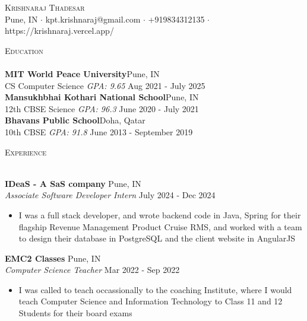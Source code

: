 \documentclass[a4paper]{article}
\newcommand{\lineunder} {
    \vspace*{-8pt} \\
    \hspace*{-18pt} \hrulefill \\
}
\newcommand{\header} [1] {
    {\hspace*{-18pt}\vspace*{6pt} \textsc{#1}}
    \vspace*{-6pt} \lineunder
}
\begin{document}
\vspace*{-40pt}

    

\vspace*{-10pt}
\begin{center}
	{\Huge \scshape {Krishnaraj Thadesar}}\\
	Pune, IN $\cdot$ kpt.krishnaraj@gmail.com $\cdot$ +919834312135 $\cdot$ https://krishnaraj.vercel.app/\\
\end{center}

\header{Education}
\textbf{MIT World Peace University}\hfill Pune, IN\\
CS Computer Science \textit{GPA: 9.65} \hfill Aug 2021 - July 2025\\
\vspace{2mm}
\textbf{Mansukhbhai Kothari National School}\hfill Pune, IN\\
12th CBSE Science \textit{GPA: 96.3} \hfill June 2020 - July 2021\\
\vspace{2mm}
\textbf{Bhavans Public School}\hfill Doha, Qatar\\
10th CBSE \textit{GPA: 91.8} \hfill June 2013 - September 2019\\
\vspace{2mm}

\header{Experience}
\vspace{1mm}

\textbf{IDeaS - A SaS company} \hfill Pune, IN\\
\textit{Associate Software Developer Intern} \hfill July 2024 - Dec 2024\\
\vspace{-1mm}
\begin{itemize} \itemsep 1pt
	\item I was a full stack developer, and wrote backend code in Java, Spring for their flagship Revenue Management Product Cruise RMS, and worked with a team to design their database in PostgreSQL and the client website in AngularJS
\end{itemize}
\textbf{EMC2 Classes} \hfill Pune, IN\\
\textit{Computer Science Teacher} \hfill Mar 2022 - Sep 2022\\
\vspace{-1mm}
\begin{itemize} \itemsep 1pt
	\item I was called to teach occassionally to the coaching Institute, where I would teach Computer Science and Information Technology to Class 11 and 12 Students for their board exams
\end{itemize}
\end{document}
